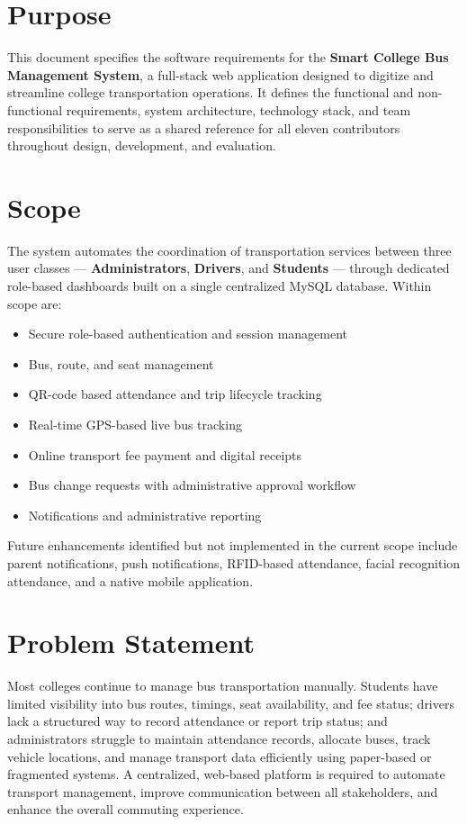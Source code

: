 \documentclass[11pt,a4paper]{report}
\begin{document}
\section{Purpose}
This document specifies the software requirements for the \textbf{Smart College Bus Management System}, a full-stack web application designed to digitize and streamline college transportation operations. It defines the functional and non-functional requirements, system architecture, technology stack, and team responsibilities to serve as a shared reference for all eleven contributors throughout design, development, and evaluation.

\section{Scope}
The system automates the coordination of transportation services between three user classes --- \textbf{Administrators}, \textbf{Drivers}, and \textbf{Students} --- through dedicated role-based dashboards built on a single centralized MySQL database. Within scope are:

\begin{itemize}[leftmargin=1.3em]
  \item Secure role-based authentication and session management
  \item Bus, route, and seat management
  \item QR-code based attendance and trip lifecycle tracking
  \item Real-time GPS-based live bus tracking
  \item Online transport fee payment and digital receipts
  \item Bus change requests with administrative approval workflow
  \item Notifications and administrative reporting
\end{itemize}

Future enhancements identified but not implemented in the current scope include parent notifications, push notifications, RFID-based attendance, facial recognition attendance, and a native mobile application.

\section{Problem Statement}
Most colleges continue to manage bus transportation manually. Students have limited visibility into bus routes, timings, seat availability, and fee status; drivers lack a structured way to record attendance or report trip status; and administrators struggle to maintain attendance records, allocate buses, track vehicle locations, and manage transport data efficiently using paper-based or fragmented systems. A centralized, web-based platform is required to automate transport management, improve communication between all stakeholders, and enhance the overall commuting experience.
\end{document}
